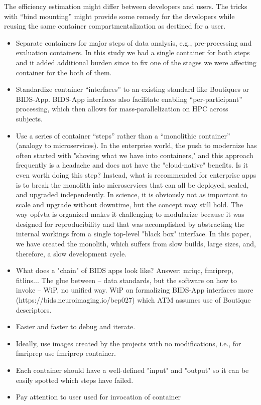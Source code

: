 \begin{itemize}
    The efficiency estimation might differ between developers and users.
    The tricks with ``bind mounting'' might provide some remedy for the developers while reusing the same container compartmentalization as destined for a user.
    \begin{itemize}
    \item
      Separate containers for major steps of data analysis, e.g., pre-processing and evaluation containers.
      In this study we had a single container for both steps and it added additional burden since to fix one of the stages we were affecting container for the both of them. 
    \item
      Standardize container ``interfaces'' to an existing standard like Boutiques or BIDS-App.
      BIDS-App interfaces also facilitate enabling ``per-participant'' processing, which then allows for mass-parallelization on HPC across subjects.
    \item
      Use a series of container ``steps'' rather than a ``monolithic container'' (analogy to microservices).
      In the enterprise world, the push to modernize has often started with "shoving what we have into containers," and this approach frequently is a headache and does not have the "cloud-native" benefits. Is it even worth doing this step?
      Instead, what is recommended for enterprise apps is to break the monolith into microservices that can all be deployed, scaled, and upgraded independently.
      In science, it is obviously not as important to scale and upgrade without downtime, but the concept may still hold.
      The way opfvta is organized makes it challenging to modularize because it was designed for reproducibility and that was accomplished by abstracting the internal workings from a single top-level "black box" interface.
      In this paper, we have created the monolith, which suffers from slow builds, large sizes, and, therefore, a slow development cycle.
      \item What does a "chain" of BIDS apps look like?  Answer: mriqc, fmriprep, fitlins... The glue between -- data standards, but the software on how to invoke -- WiP, no unified way. WiP on formalizing BIDS-App interfaces more (https://bids.neuroimaging.io/bep027) which ATM assumes use of Boutique descriptors.
      \item Easier and faster to debug and iterate.
      \item Ideally, use images created by the projects with no modifications, i.e., for fmriprep use fmriprep container.
      \item Each container should have a well-defined "input" and "output" so it can be easily spotted which steps have failed.
      \item Pay attention to user used for invocation of container


\end{itemize}
\end{itemize}
